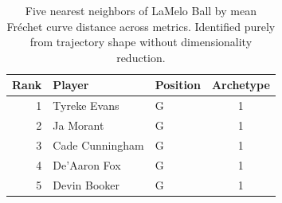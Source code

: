 \begin{table}[htbp]
  \centering\small
  \begin{tabular}{rllc}
    \toprule
    Rank & Player & Position & Archetype \\
    \midrule
    1 & Tyreke Evans & G & 1 \\
    2 & Ja Morant & G & 1 \\
    3 & Cade Cunningham & G & 1 \\
    4 & De'Aaron Fox & G & 1 \\
    5 & Devin Booker & G & 1 \\
    \bottomrule
  \end{tabular}
  \caption{Five nearest neighbors of LaMelo Ball by mean Fr\'{e}chet curve distance across metrics. Identified purely from trajectory shape without dimensionality reduction.}
  \label{tab:LaMelo_Ball_frechet_curve_neighbors}
\end{table}

